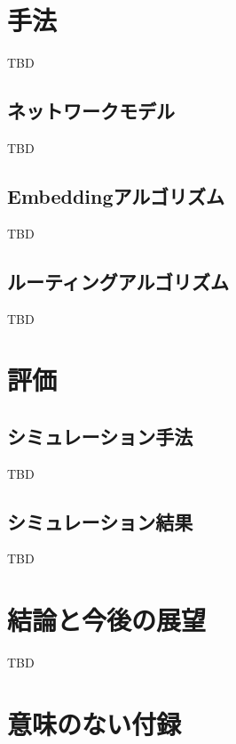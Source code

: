 \documentclass[dvipdfmx]{ampbt}
\begin{document}
\section{手法}
TBD
   \subsection{ネットワークモデル}
   TBD
   \subsection{Embeddingアルゴリズム}
   TBD
   \subsection{ルーティングアルゴリズム}
   TBD


\section{評価}
  \subsection{シミュレーション手法}
  TBD
  \subsection{シミュレーション結果}
  TBD
\section{結論と今後の展望}
TBD
\acknowledgment


\clearpage
{} %





\clearpage
\appendix

\section{意味のない付録}
\end{document}

